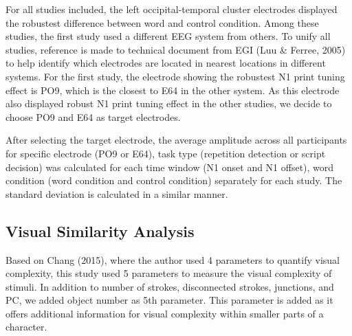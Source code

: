 \documentclass{article}
\begin{document}
For all studies included, the left occipital-temporal cluster electrodes displayed the robustest difference between word and control condition. Among these studies, the first study used a different EEG system from others. To unify all studies, reference is made to technical document from EGI (Luu \& Ferree, 2005) to help identify which electrodes are located in nearest locations in different systems. For the first study, the electrode showing the robustest N1 print tuning effect is PO9, which is the closest to E64 in the other system. As this electrode also displayed robust N1 print tuning effect in the other studies, we decide to choose PO9 and E64 as target electrodes.

After selecting the target electrode, the average amplitude across all participants for specific electrode (PO9 or E64), task type (repetition detection or script decision) was calculated for each time window (N1 onset and N1 offset), word condition (word condition and control condition) separately for each study. The standard deviation is calculated in a similar manner.

\subsection{Visual Similarity Analysis}

Based on Chang (2015), where the author used 4 parameters to quantify visual complexity, this study used 5 parameters to measure the visual complexity of stimuli. In addition to number of strokes, disconnected strokes, junctions, and PC, we added object number as 5th parameter. This parameter is added as it offers additional information for visual complexity within smaller parts of a character. 
\end{document}
